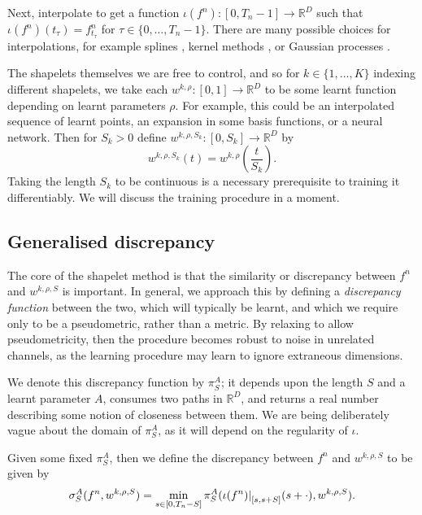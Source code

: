 \documentclass{article}
\theoremstyle{plain}
\theoremstyle{definition}
\newcommand{\reals}{\mathbb{R}}
\newcommand{\restr}[2]{{\left.\kern-\nulldelimiterspace #1 \right|_{#2}}}
\begin{document}
	Next, interpolate to get a function $\iota(f^n) \colon [0, T_n - 1] \to \reals^D$ such that $\iota(f^n)(t_\tau) = f^n_{t_\tau}$ for $\tau \in \{0, \ldots, T_n - 1\}$. There are many possible choices for interpolations, for example splines \cite{TODO}, kernel methods \cite{interpolation-prediction}, or Gaussian processes \cite{gp-adapter1, gp-adapter2}.
	
	The shapelets themselves we are free to control, and so for $k \in \{1, \ldots, K\}$ indexing different shapelets, we take each $w^{k, \rho} \colon [0, 1] \to \reals^D$ to be some learnt function depending on learnt parameters $\rho$. For example, this could be an interpolated sequence of learnt points, an expansion in some basis functions, or a neural network. Then for $S_k > 0$ define $w^{k, \rho, S_k} \colon [0, S_k] \to \reals^D$ by
	\begin{equation*}
	w^{k, \rho, S_k}(t) = w^{k, \rho}\left(\frac{t}{S_k}\right).
	\end{equation*}
	Taking the length $S_k$ to be continuous is a necessary prerequisite to training it differentiably. We will discuss the training procedure in a moment.
	
	\subsection{Generalised discrepancy}
	The core of the shapelet method is that the similarity or discrepancy between $f^n$ and $w^{k, \rho, S}$ is important. In general, we approach this by defining a \emph{discrepancy function} between the two, which will typically be learnt, and which we require only to be a pseudometric, rather than a metric. By relaxing to allow pseudometricity, then the procedure becomes robust to noise in unrelated channels, as the learning procedure may learn to ignore extraneous dimensions.
	
	We denote this discrepancy function by $\pi^A_S$; it depends upon the length $S$ and a learnt parameter $A$, consumes two paths in $\reals^D$, and returns a real number describing some notion of closeness between them. We are being deliberately vague about the domain of $\pi^A_S$, as it will depend on the regularity of $\iota$.	
	
	Given some fixed $\pi^A_S$, then we define the discrepancy between $f^n$ and $w^{k, \rho, S}$ to be given by
	\begin{equation}\label{eq:new-sigma}
	\sigma^A_S(f^n, w^{k, \rho, S}) = \min_{s \in [0, T_n - S]} \pi^A_S(\restr{\iota(f^n)}{[s, s + S]}(s + \cdot), w^{k, \rho, S}).
	\end{equation}
	
\end{document}
